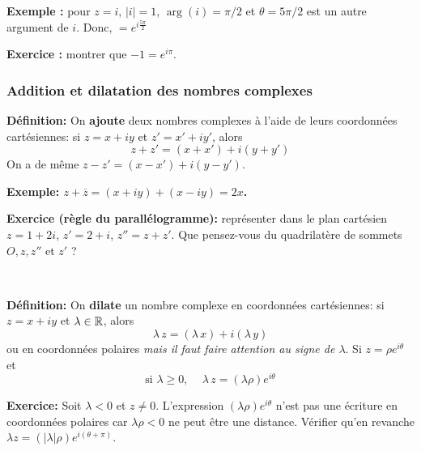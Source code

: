 \begin{frame}
{\small 
{\bf Exemple : } 
pour $z=i$, $\vert i\vert=1$, $\arg(i)=\pi/2$  et $\theta=5\pi/2$ est un autre argument de $i$. Donc, $=e^{i\frac{5\pi}2}$
\medskip

{\bf Exercice : } montrer que $\boxed{-1=e^{i\pi}}$.
}

\end{frame}


\begin{frame}
\frametitle{\bf Addition et dilatation des nombres complexes}
\medskip 

{\bf D\'efinition:} 
On {\bf ajoute} deux nombres complexes à l'aide de leurs coordonnées cartésiennes: si $z=x+iy$ et $z'=x'+iy'$, alors
$$
\boxed{z+z' = (x+x')+i(y+y')}
$$
{\small On a de même $z-z' = (x-x')+i(y-y')$.}

{\bf Exemple: $z+\overline z = (x+iy) + (x-iy) = 2x$.}
\vspace*{2mm}

{\small {\bf Exercice (règle du parallélogramme):} représenter dans le plan cartésien $z=1+2i$, $z'=2+i$, $z''=z+z'$. Que pensez-vous du quadrilatère de sommets $O,z,z''$ et $z'$ ?}

\

{\bf D\'efinition:} 
On {\bf dilate} un nombre complexe en coordonnées cartésiennes: si $z=x+iy$ et $\lambda\in\mathbb R$, alors
$$\boxed{
\lambda\,z = (\lambda\,x)+i(\lambda\,y)
}
$$
{\small ou en coordonnées polaires {\it mais il faut faire attention au signe de $\lambda$}. Si $z=\rho e^{i\theta}$ et  
$$\boxed{
\text{si $\lambda\ge 0$, }\quad\lambda\,z = (\lambda\rho)e^{i\theta}
}
$$}
\vspace*{1mm}

{\small {\bf Exercice:} Soit $\lambda<0$ et $z\neq0$. L'expression $(\lambda\rho)e^{i\theta}$ n'est pas une écriture en coordonnées polaires car $\lambda\rho<0$ ne peut être une distance. Vérifier qu'en revanche $\lambda z = (\vert\lambda\vert\rho)e^{i(\theta+\pi)}$.}

\end{frame}


